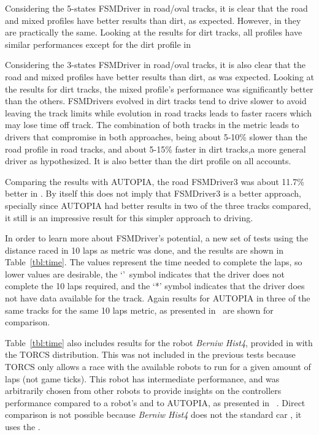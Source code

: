 Considering the 5-states FSMDriver in road/oval tracks, it is clear that the road and mixed profiles have better results than dirt, as expected. However, in  they are practically the same.  Looking at the results for dirt tracks, all profiles have similar performances except for the dirt profile in  

Considering the 3-states FSMDriver in road/oval tracks, it is also clear that the road and mixed profiles have better results than dirt, as was expected. Looking at the results for dirt tracks, the mixed profile's performance was significantly better than the others. FSMDrivers evolved in dirt tracks tend to drive slower to avoid leaving the track limits while evolution in road tracks leads to faster racers which may lose time off track. The combination of both tracks in the metric leads to drivers that compromise in both approaches, being about 5-10\% slower than the road profile in road tracks, and about 5-15\% faster in dirt tracks,a more general driver as hypothesized. It is also better than the dirt profile on all accounts.

Comparing the results with AUTOPIA, the road FSMDriver3 was about 11.7\% better in . By itself this does not imply that FSMDriver3 is a better approach, specially since AUTOPIA had better results in two of the three tracks compared, it still is an impressive result for this simpler approach to driving.

In order to learn more about FSMDriver's potential, a new set of tests using the distance raced in 10 laps as metric was done, and the results are shown in Table~\ref{tbl:time}. The values represent the time needed to complete the laps, so lower values are desirable, the `\textdagger'~symbol indicates that the driver does not complete the 10 laps required, and the `*' symbol indicates that the driver does not have data available for the track. Again results for AUTOPIA in three of the same tracks for the same 10 laps metric, as presented in~\cite{AUTOPIA} are shown for comparison.

Table~\ref{tbl:time} also includes results for the robot \emph{Berniw Hist4}, provided in with the TORCS distribution. This was not included in the previous tests because TORCS only allows a race with the available robots to run for a given amount of laps (not game ticks). This robot has intermediate performance, and was arbitrarily chosen from other robots to provide insights on the controllers performance compared to a robot's and to AUTOPIA, as presented in ~\cite{AUTOPIA}. Direct comparison is not possible because \emph{Berniw Hist4} does not the standard car , it uses the .

